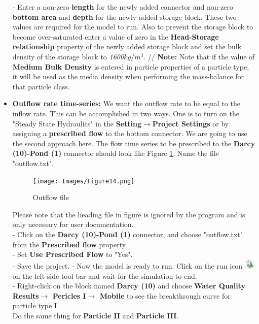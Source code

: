 \begin{itemize}
- Enter a non-zero \textbf{length} for the newly added connector and non-zero \textbf{bottom area} and  \textbf{depth} for the newly added storage block. These two values are required for the model to run. Also to prevent the storage block to become over-saturated enter a value of zero in the \textbf{Head-Storage relationship} property of the newly added storage block and set the bulk density of the storage block to \textit{1600$kg/m^3$}. //
\textbf{Note: } Note that if the value of \textbf{Medium Bulk Density} is entered in particle properties of a particle type, it will be used as the media density when performing the mass-balance for that particle class. 
\item \textbf{Outflow rate time-series: } We want the outflow rate to be equal to the inflow rate. This can be accomplished in two ways. One is to turn on the "Steady State Hydraulics" in the \textbf{Setting$\rightarrow$Project Settings} or by assigning a \textbf{prescribed flow} to the bottom connector. We are going to use the second approach here. The flow time series to be prescribed to the \textbf{Darcy (10)-Pond (1)} connector should look like Figure \ref{fig:14}. Name the file "outflow.txt". 
\begin{figure}[!ht]\label{fig:14}
\begin{center}
\texttt{[image: Images/Figure14.png]} \\
\caption{Outflow file} 
\end{center}
\end{figure}
Please note that the heading file in figure \label{fig:14} is ignored by the program and is only necessary for user documentation. \\
- Click on the \textbf{Darcy (10)-Pond (1)} connector, and choose "outflow.txt" from the \textbf{Prescribed flow} property. \\
- Set \textbf{Use Prescribed Flow} to "Yes". \\
- Save the project. 
- Now the model is ready to run. Click on the run icon \includegraphics[width=0.5cm]{Icons/run_icon.png} on the left side tool bar and wait for the simulation to end. \\
- Right-click on the block named \textbf{Darcy (10)} and choose \textbf{Water Quality Results$\rightarrow$ Pericles I$\rightarrow$ Mobile} to see the breakthrough curve for particle type I \\
Do the same thing for \textbf{Particle II} and \textbf{Particle III}. 

\end{itemize}
